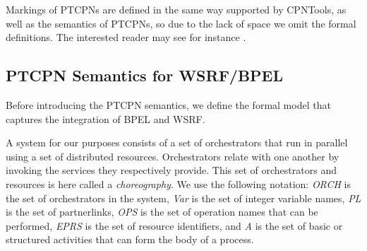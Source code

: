 
Markings of PTCPNs are defined in the same way supported by CPNTools,
as well as the semantics of PTCPNs, so due to the lack of space
we omit the formal definitions. The interested reader may
see for instance \cite{Jensen2009}.%


\subsection{PTCPN Semantics for WSRF/BPEL}

Before introducing the PTCPN semantics, we 
define the formal model that 
captures the integration of BPEL and WSRF.

A system for our purposes consists of a set of orchestrators
that run in parallel using a set of distributed resources.
Orchestrators relate with one another by
invoking the services they respectively provide.
This set of orchestrators and resources is here called a {\em choreography}. We use the following notation: {\it ORCH} is the set of orchestrators in the system, {\it Var} is the set of integer variable names, {\it PL} is the set of partnerlinks, {\it OPS} is the set of operation names that can be performed, {\it EPRS} is the set of resource identifiers, and {\it A} is the set of basic or structured activities that can form the body of a process. 

